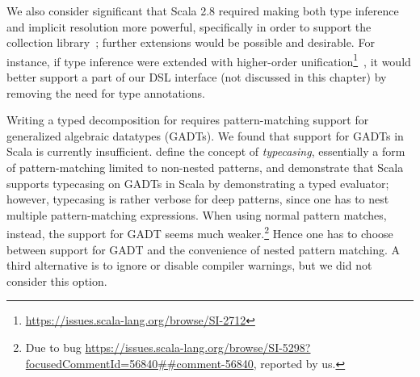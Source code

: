 We also consider significant that Scala 2.8 required making both type inference and implicit resolution more powerful, specifically in order to support the collection library~\citep[Sec 21.7]{Moors10TCP,Odersky11book}; further extensions would be possible and desirable.
For instance, if type inference were extended with higher-order unification\footnote{\url{https://issues.scala-lang.org/browse/SI-2712}}~\citep{Pfenning88}, it would better support a part of our DSL interface (not discussed in this chapter) by removing the need for type annotations.



Writing a typed decomposition for  requires pattern-matching support for generalized algebraic datatypes (GADTs). We found that support for GADTs in Scala is currently insufficient. \citet{Emir07Patterns} define the concept of \emph{typecasing}, essentially a form of pattern-matching limited to non-nested patterns, and demonstrate that Scala supports typecasing on GADTs in Scala by demonstrating a typed evaluator; however, typecasing is rather verbose for deep patterns, since one has to nest multiple pattern-matching expressions.
When using normal pattern matches, instead, the support for GADT seems much weaker.\footnote{Due to bug \url{https://issues.scala-lang.org/browse/SI-5298?focusedCommentId=56840##comment-56840}, reported by us.}
Hence one has to choose between support for GADT and the convenience of nested pattern matching.
A third alternative is to ignore or disable compiler warnings, but we did not consider this option. 


